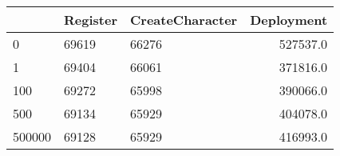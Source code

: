 \begin{tabular}{lllr}
\toprule
{} & Register & CreateCharacter &  Deployment \\
\midrule
0      &    69619 &           66276 &    527537.0 \\
1      &    69404 &           66061 &    371816.0 \\
100    &    69272 &           65998 &    390066.0 \\
500    &    69134 &           65929 &    404078.0 \\
500000 &    69128 &           65929 &    416993.0 \\
\bottomrule
\end{tabular}
